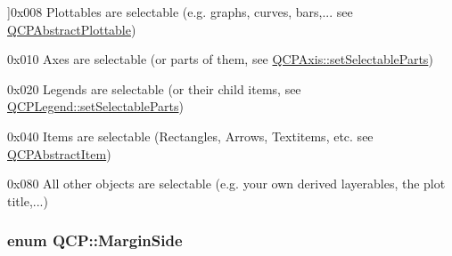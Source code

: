 \begin{Desc}
\begin{description}
{}]{\ttfamily 0x008} Plottables are selectable (e.\+g. graphs, curves, bars,... see \hyperlink{classQCPAbstractPlottable}{Q\+C\+P\+Abstract\+Plottable}) \item[{\em 
\hypertarget{namespaceQCP_a2ad6bb6281c7c2d593d4277b44c2b037ad6644ac55bef621645326e9dd7469caa}{}i\+Select\+Axes\label{namespaceQCP_a2ad6bb6281c7c2d593d4277b44c2b037ad6644ac55bef621645326e9dd7469caa}
}]{\ttfamily 0x010} Axes are selectable (or parts of them, see \hyperlink{classQCPAxis_a513f9b9e326c505d9bec54880031b085}{Q\+C\+P\+Axis\+::set\+Selectable\+Parts}) \item[{\em 
\hypertarget{namespaceQCP_a2ad6bb6281c7c2d593d4277b44c2b037a269c9af298e257d1108edec0432b5513}{}i\+Select\+Legend\label{namespaceQCP_a2ad6bb6281c7c2d593d4277b44c2b037a269c9af298e257d1108edec0432b5513}
}]{\ttfamily 0x020} Legends are selectable (or their child items, see \hyperlink{classQCPLegend_a9ce60aa8bbd89f62ae4fa83ac6c60110}{Q\+C\+P\+Legend\+::set\+Selectable\+Parts}) \item[{\em 
\hypertarget{namespaceQCP_a2ad6bb6281c7c2d593d4277b44c2b037aea2f7c105d674e76d9b187b02ef29260}{}i\+Select\+Items\label{namespaceQCP_a2ad6bb6281c7c2d593d4277b44c2b037aea2f7c105d674e76d9b187b02ef29260}
}]{\ttfamily 0x040} Items are selectable (Rectangles, Arrows, Textitems, etc. see \hyperlink{classQCPAbstractItem}{Q\+C\+P\+Abstract\+Item}) \item[{\em 
\hypertarget{namespaceQCP_a2ad6bb6281c7c2d593d4277b44c2b037af67a50bc26147a13b551b3a625374949}{}i\+Select\+Other\label{namespaceQCP_a2ad6bb6281c7c2d593d4277b44c2b037af67a50bc26147a13b551b3a625374949}
}]{\ttfamily 0x080} All other objects are selectable (e.\+g. your own derived layerables, the plot title,...) \end{description}
\end{Desc}
\hypertarget{namespaceQCP_a7e487e3e2ccb62ab7771065bab7cae54}{}
\subsubsection[{Margin\+Side}]{\setlength{\rightskip}{0pt plus 5cm}enum {\bf Q\+C\+P\+::\+Margin\+Side}}\label{namespaceQCP_a7e487e3e2ccb62ab7771065bab7cae54}


